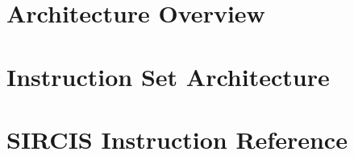 \documentclass[11pt,letterpaper,twoside]{book}
\begin{document}
\frontmatter


\tableofcontents
\listoftables
\listoffigures
{}


\mainmatter

\part{Architecture Overview}







\part{Instruction Set Architecture}





\part{SIRCIS Instruction Reference}








\appendix






\backmatter


\end{document}
